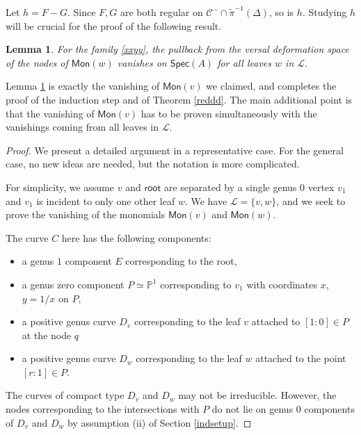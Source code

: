 \documentclass[11pt]{amsart}
\newtheorem{lem}[thm]{Lemma}
\theoremstyle{definition}
\renewcommand{\tilde}{\widetilde}
\begin{document}
{Let $h=F-G$. Since $F, G$ are both regular on ${\mathcal C}^{-}\cap \tilde \pi^{-1}(\Delta)$, so is $h$. Studying $h$ will be crucial for the proof of the following result. 

\begin{lem}\label{annoyingyetnice}
For the family \eqref{xxyy}, the pullback
from the versal deformation space of the nodes
of $\mathsf{Mon}(w)$ vanishes on
$\mathsf{Spec}(A)$ for all leaves $w$ in $\mathcal {L}.$
\end{lem}

Lemma \ref{annoyingyetnice} is exactly the vanishing of $\textsf{Mon}(v)$ we claimed, and completes the proof of the induction
step and of Theorem \ref{reddd}. The main additional point is that the vanishing of $\textsf{Mon}(v)$ has to be proven simultaneously with the vanishings coming from all leaves in $\mathcal L$.  

\begin{proof} We present a
detailed argument in a
representative case. For the general case, no new ideas are needed, but the
notation is more complicated.  

For simplicity, we assume $v$ and $\mathsf{root}$ are separated by a single genus $0$ vertex $v_1$ and $v_1$ is incident
to only one other leaf $w$. We have $\mathcal L=\{v, w\}$, and we seek to prove the vanishing of the monomials $\mathsf{Mon}(v)$ and $\mathsf{Mon}(w)$. 

\begin{center}
\end{center}
The curve $C$ here has the following components:
\begin{itemize}
    \item a genus $1$ component $E$ corresponding to the root,
\item a genus zero component $P\simeq \mathbb P^1$ corresponding to $v_1$ with coordinates $x$, $y=1/x$ on $P$, 
\item a positive genus curve $D_v$ corresponding to the leaf $v$ attached to $[1: 0]\in P$ at the node $q$
\item a positive genus curve $D_w$ corresponding to the leaf $w$ attached to the point $[r: 1]\in P$. \end{itemize} 
The curves of compact type $D_v$ and $D_w$ may not be irreducible. However, the nodes corresponding to the intersections with $P$ do not lie on genus $0$ components of $D_v$ and $D_w$ by assumption (ii) of Section \ref{indsetup}. 


\end{proof}}
\end{document}
